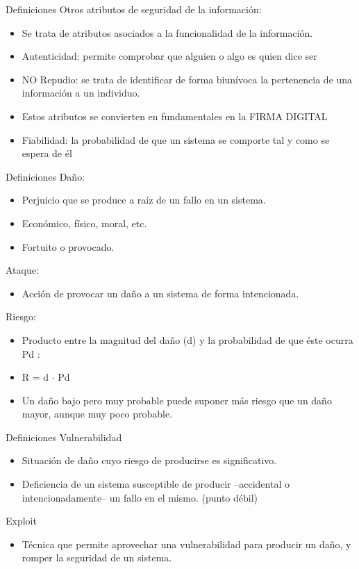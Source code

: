 \documentclass[aspectratio=169,11pt]{beamer}
\begin{document}
\begin{frame}[allowframebreaks]{Definiciones}
\small
Otros atributos de seguridad de la información:
  \begin{itemize}
  \item Se trata de atributos asociados a la funcionalidad de la información.
  \item Autenticidad: permite comprobar que alguien o algo es quien dice ser
  \item NO Repudio: se trata de identificar de forma biunívoca la pertenencia de una información a un individuo.
  \item Estos atributos se convierten en fundamentales en la FIRMA DIGITAL
  \item Fiabilidad: la probabilidad de que un sistema se comporte tal y como se espera de él
  \end{itemize}
\end{frame}

\begin{frame}[allowframebreaks]{Definiciones}
\small
  Daño:
  \begin{itemize}
  \item Perjuicio que se produce a raíz de un fallo en un sistema.
  \item Económico, físico, moral, etc.
  \item Fortuito o provocado.
  \end{itemize}
  Ataque:
  \begin{itemize}
  \item Acción de provocar un daño a un sistema de forma intencionada.
  \end{itemize}
  Riesgo:
  \begin{itemize}
  \item Producto entre la magnitud del daño (d) y la probabilidad de que éste ocurra Pd :
  \item R = d $\cdot$ Pd
  \item Un daño bajo pero muy probable puede suponer más riesgo que un daño mayor, aunque muy poco probable.
  \end{itemize}
\end{frame}

\begin{frame}[allowframebreaks]{Definiciones}
\small
Vulnerabilidad
  \begin{itemize}
  \item Situación de daño cuyo riesgo de producirse es significativo.
  \item Deficiencia de un sistema susceptible de producir --accidental o intencionadamente-- un fallo en el mismo. (punto débil)
  \end{itemize}
  Exploit
  \begin{itemize}
  \item Técnica que permite aprovechar una vulnerabilidad para producir un daño, y romper la seguridad de un sistema.
  \end{itemize}
\end{frame}
\end{document}

